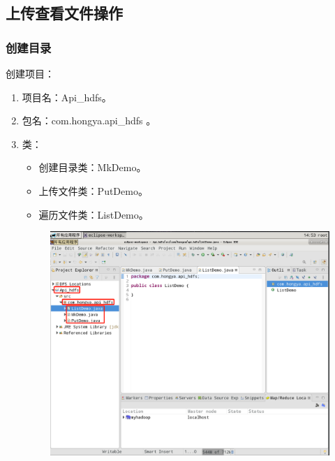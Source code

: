 \documentclass {article}
\begin{document}
		\subsection{上传查看文件操作}
			\subsubsection{创建目录}
				创建项目：
				\begin{enumerate}
					\item 项目名：Api\_hdfs。
					\item 包名：com.hongya.api\_hdfs 。
					\item 类：
					\begin{itemize}
						\item 创建目录类：MkDemo。
						\item 上传文件类：PutDemo。
						\item 遍历文件类：ListDemo。
					\end{itemize}
					\begin{figure}[H]
						\centering
						\includegraphics[width=4.5in]{figures/fig17.png}
					\end{figure}
				\end{enumerate}
			
\end{document}
